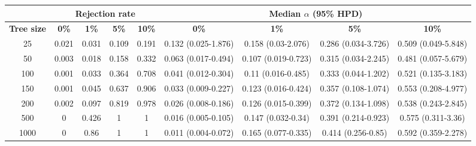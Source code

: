 \begin{tabular}{ccccccccc}
  \hline
  & \multicolumn{4}{c}{\textbf{Rejection rate}} & \multicolumn{4}{c}{\textbf{Median $\alpha$ (95\% HPD)}} \\
  \hline
  \textbf{Tree size}    &    \textbf{0\%} & \textbf{1\%}  & \textbf{5\%}  &  \textbf{10\%}   &    \textbf{0\%} & \textbf{1\%}  & \textbf{5\%}  &  \textbf{10\%} \\
  \hline
25  & 0.021 & 0.031 & 0.109 & 0.191 & 0.132 (0.025-1.876) & 0.158 (0.03-2.076)  & 0.286 (0.034-3.726) & 0.509 (0.049-5.848) \\
50  & 0.003 & 0.018 & 0.158 & 0.332 & 0.063 (0.017-0.494) & 0.107 (0.019-0.723) & 0.315 (0.034-2.245) & 0.481 (0.057-5.679) \\
100 & 0.001 & 0.033 & 0.364 & 0.708 & 0.041 (0.012-0.304) & 0.11 (0.016-0.485)  & 0.333 (0.044-1.202) & 0.521 (0.135-3.183) \\
150 & 0.001 & 0.045 & 0.637 & 0.906 & 0.033 (0.009-0.227) & 0.123 (0.016-0.424) & 0.357 (0.108-1.074) & 0.553 (0.208-4.977) \\
200 & 0.002 & 0.097 & 0.819 & 0.978 & 0.026 (0.008-0.186) & 0.126 (0.015-0.399) & 0.372 (0.134-1.098) & 0.538 (0.243-2.845) \\
500 & 0 & 0.426 & 1 & 1 & 0.016 (0.005-0.105) & 0.147 (0.032-0.34)  & 0.391 (0.214-0.923) & 0.575 (0.311-3.36)  \\
1000  & 0 & 0.86  & 1 & 1 & 0.011 (0.004-0.072) & 0.165 (0.077-0.335) & 0.414 (0.256-0.85)  & 0.592 (0.359-2.278) \\
  \hline
\end{tabular}